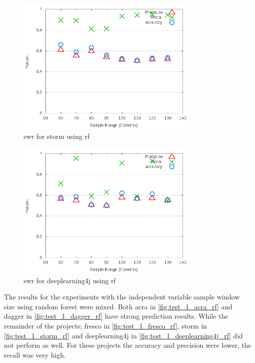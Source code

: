 \begin{figure}[!ht]
    \centering
        \includegraphics[width=0.8\textwidth]{images/rf/test_1/storm_sample_range}
        \caption{\gls{swr} for storm using \gls{rf}}
        \label{fig:test_1_storm_rf}
\end{figure}

\begin{figure}[!ht]
    \centering
        \includegraphics[width=0.8\textwidth]{images/rf/test_1/deeplearning4j_sample_range}
    \caption{\gls{swr} for deeplearning4j using \gls{rf}}
    \label{fig:test_1_deeplearning4j_rf}
\end{figure}


The results for the experiments with the independent variable sample window size using random forest were mixed. Both acra in \autoref{fig:test_1_acra_rf} and dagger in \autoref{fig:test_1_dagger_rf} have strong prediction results. While the remainder of the projects; fresco in \autoref{fig:test_1_fresco_rf}, storm in \autoref{fig:test_1_storm_rf} and deeplearning4j in \autoref{fig:test_1_deeplearning4j_rf} did not perform as well. For these projects the accuracy and precision were lower, the recall was very high.


